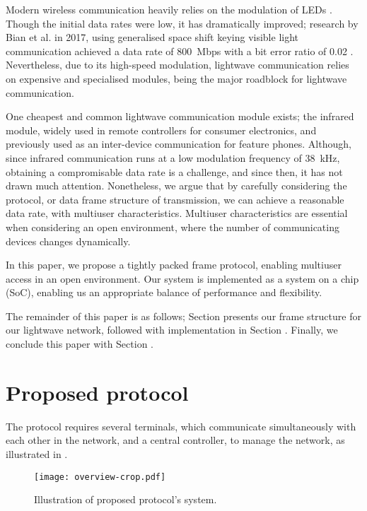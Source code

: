 ﻿\documentclass[twocolumn,9pt]{scrartcl}
\renewcommand{\ref}{\Cref}
\begin{document}
Modern wireless communication heavily relies on the modulation of LEDs \cite{nakagawa2004}.
Though the initial data rates were low, it has dramatically improved;
research by Bian et al. in 2017, using generalised space shift keying visible light communication achieved a data rate of \SI{800}{Mbps} with a bit error ratio of 0.02 \cite{Bian2017}.
Nevertheless, due to its high-speed modulation, lightwave communication relies on expensive and specialised modules, being the major roadblock for lightwave communication.

One cheapest and common lightwave communication module exists; the infrared module, widely used in remote controllers for consumer electronics, and previously used as an inter-device communication for feature phones.
Although, since infrared communication runs at a low modulation frequency of \SI{38}{kHz}, obtaining a compromisable data rate is a challenge, and since then, it has not drawn much attention.
Nonetheless, we argue that by carefully considering the protocol, or data frame structure of transmission, we can achieve a reasonable data rate, with multiuser characteristics.
Multiuser characteristics are essential when considering an open environment, where the number of communicating devices changes dynamically.

In this paper, we propose a tightly packed frame protocol, enabling multiuser access in an open environment.
Our system is implemented as a system on a chip (SoC), enabling us an appropriate balance of performance and flexibility.

The remainder of this paper is as follows;
Section \ref{sec:prp} presents our frame structure for our lightwave network, followed with implementation in Section \ref{sec:impl}.
Finally, we conclude this paper with Section \ref{sec:cncl}.

\section{Proposed protocol}
The protocol requires several terminals, which communicate simultaneously with each other in the network, and a central controller, to manage the network, as illustrated in \ref{fig:overview}.

\begin{figure}[tb]
  \centering
  \texttt{[image: overview-crop.pdf]}
  \caption{\label{fig:overview}
    Illustration of proposed protocol's system.
  }
\end{figure}
\end{document}
